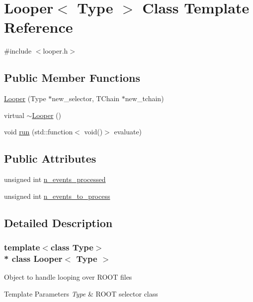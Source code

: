 \hypertarget{classLooper}{}\section{Looper$<$ Type $>$ Class Template Reference}
\label{classLooper}


{\ttfamily \#include $<$looper.\+h$>$}

\subsection*{Public Member Functions}
\begin{DoxyCompactItemize}
\item 
\hyperlink{classLooper_a34cd93fad2506bf594fc360ca4a72c14}{Looper} (Type $\ast$new\+\_\+selector, T\+Chain $\ast$new\+\_\+tchain)
\item 
virtual \hyperlink{classLooper_a2ab3ca481534b316d9844ada765b74b3}{$\sim$\+Looper} ()
\item 
void \hyperlink{classLooper_abfa564ca48778da1f58c8a6444ddd463}{run} (std\+::function$<$ void()$>$ evaluate)
\end{DoxyCompactItemize}
\subsection*{Public Attributes}
\begin{DoxyCompactItemize}
\item 
unsigned int \hyperlink{classLooper_a97e473848469359cd33cd23771e0eb28}{n\+\_\+events\+\_\+processed}
\item 
unsigned int \hyperlink{classLooper_a666747cb782bd6082452a6d5ac18f94f}{n\+\_\+events\+\_\+to\+\_\+process}
\end{DoxyCompactItemize}


\subsection{Detailed Description}
\subsubsection*{template$<$class Type$>$\\*
class Looper$<$ Type $>$}

Object to handle looping over R\+O\+OT files 
\begin{DoxyTemplParams}{Template Parameters}
{\em Type} & R\+O\+OT selector class \\
\hline
\end{DoxyTemplParams}


